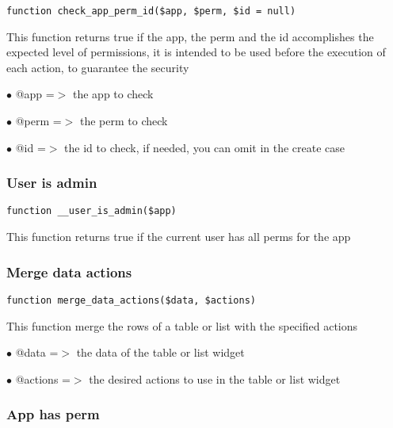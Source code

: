 \documentclass[a4paper]{article}
\begin{document}
\begin{lstlisting}
function check_app_perm_id($app, $perm, $id = null)
\end{lstlisting}

This function returns true if the app, the perm and the id accomplishes the
expected level of permissions, it is intended to be used before the execution
of each action, to guarantee the security

\begin{compactitem}
\item[\color{myblue}$\bullet$] @app  =$>$ the app to check
\item[\color{myblue}$\bullet$] @perm =$>$ the perm to check
\item[\color{myblue}$\bullet$] @id   =$>$ the id to check, if needed, you can omit in the create case
\end{compactitem}

\hypertarget{toc197}{}
\subsubsection{User is admin}

\begin{lstlisting}
function __user_is_admin($app)
\end{lstlisting}

This function returns true if the current user has all perms for the app

\hypertarget{toc198}{}
\subsubsection{Merge data actions}

\begin{lstlisting}
function merge_data_actions($data, $actions)
\end{lstlisting}

This function merge the rows of a table or list with the specified actions

\begin{compactitem}
\item[\color{myblue}$\bullet$] @data    =$>$ the data of the table or list widget
\item[\color{myblue}$\bullet$] @actions =$>$ the desired actions to use in the table or list widget
\end{compactitem}

\hypertarget{toc199}{}
\subsubsection{App has perm}
\end{document}
